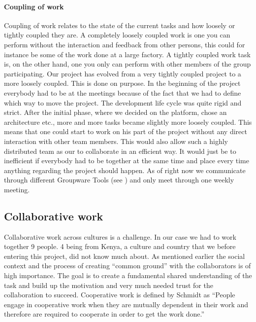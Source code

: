\paragraph{Coupling of work} \label{par:couplingofwork}
Coupling of work relates to the state of the current tasks and how loosely or tightly coupled they are. A completely loosely coupled work is one you can perform without the interaction and feedback from other persons, this could for instance be some of the work done at a large factory. A tightly coupled work task is, on the other hand, one you only can perform with other members of the group participating. Our project has evolved from a very tightly coupled project to a more loosely coupled. This is done on purpose. In the beginning of the project everybody had to be at the meetings because of the fact that we had to define which way to move the project. The development life cycle was quite rigid and strict. After the initial phase, where we decided on the platform, chose an architecture etc., more and more tasks became slightly more loosely coupled. This means that one could start to work on his part of the project without any direct interaction with other team members. This would also allow such a highly distributed team as our to collaborate in an efficient way. It would just be to inefficient if everybody had to be together at the same time and place every time anything regarding the project should happen. As of right now we communicate through different Groupware Tools (see ) and only meet through one weekly meeting.

\subsection{Collaborative work} \label{sub:collaborativework}
Collaborative work across cultures is a challenge. In our case we had to work together 9 people. 4 being from Kenya, a culture and country that we before entering this project, did not know much about. As mentioned earlier the social context and the process of creating ``common ground'' with the collaborators is of high importance. The goal is to create a fundamental shared understanding of the task and build up the motivation and very much needed trust for the collaboration to succeed. Cooperative work is defined by Schmidt as ``People engage in cooperative work when they are mutually dependent in their work and therefore are required to cooperate in order to get the work done.'' \cite{schmidt1992taking}

